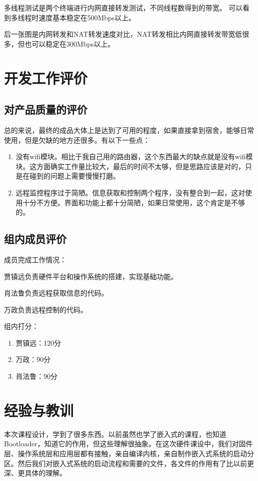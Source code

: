 \documentclass{itecreport-zh}
\begin{document}
\begin{enumerate}
      多线程测试是两个终端进行内网直接转发测试，不同线程数得到的带宽。
      可以看到多线程时速度基本稳定在500Mbps以上。


      后一张图是内网转发和NAT转发速度对比，NAT转发相比内网直接转发带宽低很多，但也可以稳定在300Mbps以上。

  \end{enumerate}

\chapter{开发工作评价}
\section{对产品质量的评价}
总的来说，最终的成品大体上是达到了可用的程度，如果直接拿到宿舍，能够日常使用，但是欠缺的地方还很多。有以下一些点：
\begin{enumerate}
  \item 没有wifi模块。相比于我自己用的路由器，这个东西最大的缺点就是没有wifi模块。这方面确实工作量比较大，最后的时间不太够，但是思路应该是对的，只是在碰到的问题上需要慢慢打磨。
  \item 远程监控程序过于简陋。信息获取和控制两个程序，没有整合到一起，这对使用十分不方便。界面和功能上都十分简陋，如果日常使用，这个肯定是不够的。
\end{enumerate}
\section{组内成员评价}
成员完成工作情况：


贾镇远负责硬件平台和操作系统的搭建，实现基础功能。


肖法鲁负责远程获取信息的代码。


万政负责远程控制的代码。



组内打分：
\begin{enumerate}
  \item 贾镇远：120分
  \item 万政：90分
  \item 肖法鲁：90分
\end{enumerate}
\chapter{经验与教训}
本次课程设计，学到了很多东西。以前虽然也学了嵌入式的课程，也知道Bootloader，知道它的作用，但这些理解很抽象。在这次硬件课设中，我们对固件层、操作系统层和应用层都有接触，亲自编译内核，亲自制作嵌入式系统的启动分区。然后我们对嵌入式系统的启动流程和需要的文件，各文件的作用有了比以前更深、更具体的理解。
\end{document}
